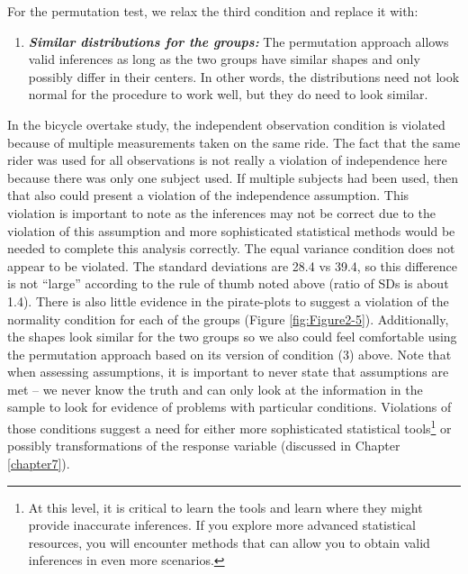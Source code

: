 \documentclass[
]{book}
\providecommand{\tightlist}{%
  \setlength{\itemsep}{0pt}\setlength{\parskip}{0pt}}
\begin{document}
For the permutation test,  we relax the third condition and replace it with:

\begin{enumerate}
\def\labelenumi{\arabic{enumi}.}
\setcounter{enumi}{2}
\tightlist
\item
  \textbf{\emph{Similar distributions for the groups:}} The permutation approach
  allows valid inferences as long as the two groups have similar shapes and only
  possibly differ in their centers. In other words, the distributions need not
  look normal for the procedure to work well, but they do need to look similar.
\end{enumerate}

\indent In the bicycle overtake study, the independent
observation condition is violated because of multiple measurements taken on the same ride. The fact that the same rider was used for all observations is not really a violation of independence here because there was only one subject used. If multiple subjects had been used, then that also could present a violation of the independence assumption. This violation is important to note as the inferences may not be correct due to the violation of this assumption and more sophisticated statistical methods would be needed to complete this analysis correctly. The equal variance condition does not appear to be violated. The standard deviations are 28.4 vs 39.4, so this difference is not ``large''
according to the rule of thumb noted above (ratio of SDs is about 1.4). There is also little evidence in the pirate-plots to suggest a violation of the normality condition for each of the groups (Figure \ref{fig:Figure2-5}). Additionally, the shapes look similar for the two groups so we also could feel comfortable using the permutation approach based on
its version of condition (3) above. Note that when assessing assumptions, it is important to never state that assumptions are met -- we never know the truth and can only look at the information in the sample to look for evidence of problems with particular conditions. Violations of those conditions suggest a need for either more sophisticated statistical tools\footnote{At this level, it is critical to learn the tools and learn where they might provide inaccurate inferences. If you explore more advanced statistical resources, you will encounter methods that can allow you to obtain valid inferences in even more scenarios.} or possibly transformations of the response variable (discussed in Chapter \ref{chapter7}).
\end{document}
